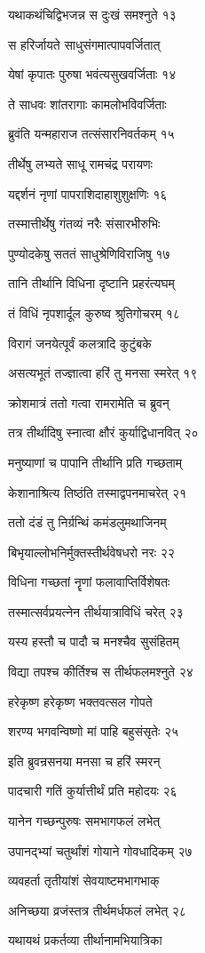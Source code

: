 यथाकथंचिद्विभजन्न स दुःखं समश्नुते १३

स हरिर्जायते साधुसंगमात्पापवर्जितात्

येषां कृपातः पुरुषा भवंत्यसुखवर्जिताः १४

ते साधवः शांतरागाः कामलोभविवर्जिताः

ब्रुवंति यन्महाराज तत्संसारनिवर्तकम् १५

तीर्थेषु लभ्यते साधू रामचंद्र परायणः

यद्दर्शनं नृणां पापराशिदाहाशुशुक्षणिः १६

तस्मात्तीर्थेषु गंतव्यं नरैः संसारभीरुभिः

पुण्योदकेषु सततं साधुश्रेणिविराजिषु १७

तानि तीर्थानि विधिना दृष्टानि प्रहरंत्यघम्

तं विधिं नृपशार्दूल कुरुष्व श्रुतिगोचरम् १८

विरागं जनयेत्पूर्वं कलत्रादि कुटुंबके

असत्यभूतं तज्ज्ञात्वा हरिं तु मनसा स्मरेत् १९

क्रोशमात्रं ततो गत्वा रामरामेति च ब्रुवन्

तत्र तीर्थादिषु स्नात्वा क्षौरं कुर्याद्विधानवित् २०

मनुष्याणां च पापानि तीर्थानि प्रति गच्छताम्

केशानाश्रित्य तिष्ठंति तस्माद्वपनमाचरेत् २१

ततो दंडं तु निर्ग्रन्थिं कमंडलुमथाजिनम्

बिभृयाल्लोभनिर्मुक्तस्तीर्थवेषधरो नरः २२

विधिना गच्छतां नॄणां फलावाप्तिर्विशेषतः

तस्मात्सर्वप्रयत्नेन तीर्थयात्राविधिं चरेत् २३

यस्य हस्तौ च पादौ च मनश्चैव सुसंहितम्

विद्या तपश्च कीर्तिश्च स तीर्थफलमश्नुते २४

हरेकृष्ण हरेकृष्ण भक्तवत्सल गोपते

शरण्य भगवन्विष्णो मां पाहि बहुसंसृतेः २५

इति ब्रुवन्रसनया मनसा च हरिं स्मरन्

पादचारी गतिं कुर्यात्तीर्थं प्रति महोदयः २६

यानेन गच्छन्पुरुषः समभागफलं लभेत्

उपानद्भ्यां चतुर्थांशं गोयाने गोवधादिकम् २७

व्यवहर्ता तृतीयांशं सेवयाष्टमभागभाक्

अनिच्छया व्रजंस्तत्र तीर्थमर्धफलं लभेत् २८

यथायथं प्रकर्तव्या तीर्थानामभियात्रिका


